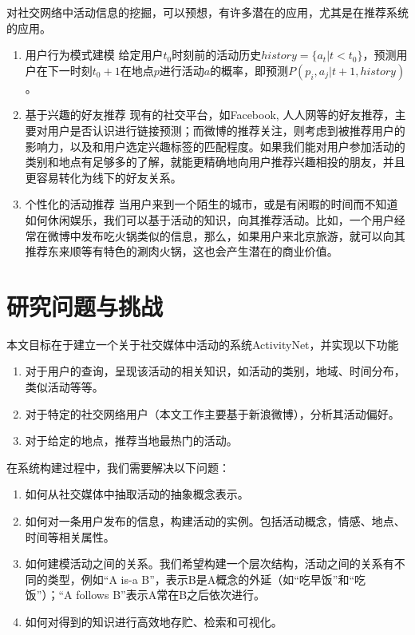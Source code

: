 对社交网络中活动信息的挖掘，可以预想，有许多潜在的应用，尤其是在推荐系统的应用。
\begin{enumerate}
\item{\heiti 用户行为模式建模} 给定用户$t_0$时刻前的活动历史$history = \{a_t|t<t_0\}$，预测用户在下一时刻$t_0+1$在地点$p$进行活动$a$的概率，即预测$P(p_i, a_j|t+1,history)$。
\item{\heiti 基于兴趣的好友推荐} 现有的社交平台，如Facebook, 人人网等的好友推荐，主要对用户是否认识进行链接预测；而微博的推荐关注，则考虑到被推荐用户的影响力，以及和用户选定兴趣标签的匹配程度。如果我们能对用户参加活动的类别和地点有足够多的了解，就能更精确地向用户推荐兴趣相投的朋友，并且更容易转化为线下的好友关系。
\item{\heiti 个性化的活动推荐} 当用户来到一个陌生的城市，或是有闲暇的时间而不知道如何休闲娱乐，我们可以基于活动的知识，向其推荐活动。比如，一个用户经常在微博中发布吃火锅类似的信息，那么，如果用户来北京旅游，就可以向其推荐东来顺等有特色的涮肉火锅，这也会产生潜在的商业价值。
\end{enumerate}

\section{研究问题与挑战}

本文目标在于建立一个关于社交媒体中活动的系统ActivityNet，并实现以下功能

\begin{enumerate}
\item 对于用户的查询，呈现该活动的相关知识，如活动的类别，地域、时间分布，类似活动等等。
\item 对于特定的社交网络用户（本文工作主要基于新浪微博），分析其活动偏好。
\item 对于给定的地点，推荐当地最热门的活动。
\end{enumerate}

在系统构建过程中，我们需要解决以下问题：

\begin{enumerate}
\item 如何从社交媒体中抽取活动的抽象概念表示。
\item 如何对一条用户发布的信息，构建活动的实例。包括活动概念，情感、地点、时间等相关属性。
\item 如何建模活动之间的关系。我们希望构建一个层次结构，活动之间的关系有不同的类型，例如``A is-a B''，表示B是A概念的外延（如``吃早饭''和``吃饭''）；``A follows B''表示A常在B之后依次进行。
\item 如何对得到的知识进行高效地存贮、检索和可视化。
\end{enumerate}

